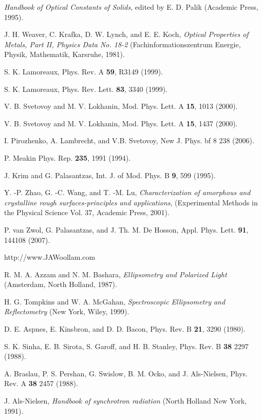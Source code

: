 \documentclass[prb]{revtex4}%
\begin{document}
\begin{references}
  {\it Handbook of Optical Constants of Solids}, edited by
E. D. Palik (Academic Press, 1995).

  J. H. Weaver, C. Krafka, D. W. Lynch, and E. E.
Koch, {\it Optical Properties of Metals, Part II, Physics Data No.
18-2} (Fachinformationszentrum Energie, Physik, Mathematik,
Karsruhe, 1981).

 S. K. Lamoreaux, Phys. Rev. A {\bf 59}, R3149
(1999).

 S. K. Lamoreaux, Phys. Rev. Lett. {\bf 83}, 3340
(1999).

  V. B. Svetovoy and M. V. Lokhanin, Mod. Phys. Lett.
A {\bf 15}, 1013 (2000).

  V. B. Svetovoy and M. V. Lokhanin, Mod. Phys. Lett.
A {\bf 15}, 1437 (2000).

 I. Pirozhenko, A. Lambrecht, and V.B. Svetovoy, New
J. Phys. {bf 8} 238 (2006).

 P. Meakin Phys. Rep. {\bf 235}, 1991 (1994).

 J. Krim and G. Palasantzas, Int. J. of Mod. Phys. B {\bf9}, 599
(1995).

 Y. -P. Zhao, G. -C. Wang, and T. -M. Lu, { \it Characterization of amorphous
and crystalline rough surfaces-principles and applications},
(Experimental Methods in the Physical Science Vol. 37, Academic
Press, 2001).

 P. van Zwol, G. Palasantzas, and J. Th. M. De
Hosson, Appl. Phys. Lett. {\bf 91}, 144108 (2007).

 http://www.JAWoollam.com

 R. M. A. Azzam and N. M. Bashara, {\it Ellipsometry and Polarized Light} (Amsterdam, North Holland, 1987).

 H. G. Tompkins and W. A. McGahan, {\it Spectroscopic Ellipsometry and Reflectometry} (New York, Wiley, 1999).

  D. E. Aspnes, E. Kinsbron, and D. D. Bacon, Phys.
Rev. B {\bf 21}, 3290 (1980).

 S. K. Sinha, E. B. Sirota, S. Garoff, and H. B. Stanley, Phys. Rev. B {\bf 38} 2297
(1988).

 A. Braslau, P. S. Pershan, G. Swislow, B. M. Ocko, and J. Als-Nielsen, Phys. Rev. A {\bf 38} 2457 (1988).

 J. Als-Nielsen, {\it Handbook of synchrotron radiation} (North Holland New York,
1991).


\end{references}
\end{document}
